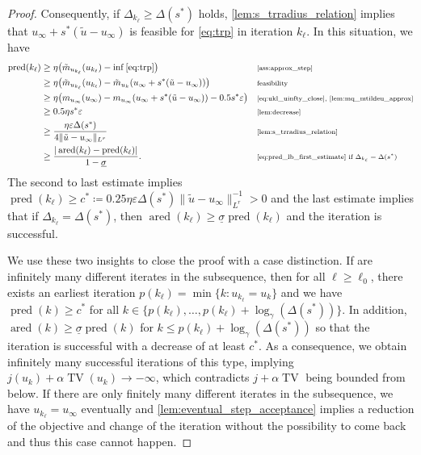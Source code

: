 \documentclass[11pt]{article}
\DeclareMathOperator*{\TV}{TV}
\DeclareMathOperator*{\pred}{pred}
\DeclareMathOperator*{\ared}{ared}
\theoremstyle{definition}
\theoremstyle{remark}
\begin{document}
\begin{proof}
Consequently, if $\Delta_{k_\ell} \ge \Delta(s^*)$
holds, \cref{lem:s_trradius_relation}
implies that $u_\infty + s^*(\tilde{u} - u_\infty)$
is feasible for \eqref{eq:trp} in iteration $k_\ell$.
In this situation, we have
%
\begin{align*}
\pred(k_\ell)
&\ge \eta\big(\tilde{m}_{u_{k_\ell}}(u_{k_\ell}) - \inf \eqref{eq:trp}\big) && \text{\scriptsize \cref{ass:approx_step}} \\
&\ge \eta\big(\tilde{m}_{u_{k_\ell}}(u_{k_\ell}) 
- \tilde{m}_{u_k}(u_\infty + s^*(\tilde{u} - u_\infty))\big)
&& \text{\scriptsize feasibility} \\
&\ge \eta\big(m_{u_\infty}(u_\infty) - m_{u_\infty}(u_\infty + s^*(\tilde{u} - u_\infty))
- 0.5 s^* \varepsilon\big) 
&& \text{\scriptsize \eqref{eq:ukl_uinfty_close},
\cref{lem:mq_mtildeu_approx}} \\
&\ge 0.5 \eta s^* \varepsilon
&& \text{\scriptsize \cref{lem:decrease}} \\
&\ge \frac{\eta \varepsilon \Delta(s^*)}{4\|\tilde{u} - u_\infty\|_{L^r}}
&& \text{\scriptsize \cref{lem:s_trradius_relation}} \\
&\ge \frac{|\ared(k_\ell) - \pred(k_\ell)|}{1 - \underline{\sigma}}.
&& \text{\scriptsize \eqref{eq:pred_lb_first_estimate}
if $\Delta_{k_\ell} = \Delta(s^*)$}
\end{align*}
%
The second to last estimate implies 
$\pred(k_\ell) \ge c^* \coloneqq 0.25 \eta \varepsilon \Delta(s^*) \|\tilde{u} - u_\infty\|_{L^r}^{-1} > 0$ and the last estimate
implies that if $\Delta_{k_\ell} = \Delta(s^*)$,
then
$\ared(k_\ell) \ge \underline{\sigma}\pred(k_\ell)$
and the iteration is successful.

We use these two insights to close the proof with a case distinction. If are infinitely many 
different iterates in the subsequence,
then for all $\ell \ge \ell_0$, there exists
an earliest iteration $p(k_{\ell}) = \min\{k : u_{k_\ell} = u_k\}$ and we have
$\pred(k) \ge c^*$ for all $k \in \{p(k_\ell),\ldots,p(k_\ell) + \log_{\gamma}(\Delta(s^*))\}$.
In addition, $\ared(k) \ge \underline{\sigma}\pred(k)$
for $k \le p(k_\ell) + \log_{\gamma}(\Delta(s^*))$
so that the iteration is successful with a decrease of
at least $c^*$. As a consequence, we obtain infinitely
many successful iterations of this type, implying
$j(u_k) + \alpha \TV(u_k) \to -\infty$, which contradicts $j + \alpha \TV$ being bounded from below.
If there are only finitely many different iterates
in the subsequence, we have $u_{k_\ell} = u_\infty$ 
eventually and
\cref{lem:eventual_step_acceptance} implies
a reduction of the objective and change of the iteration without the possibility to come back
and thus this case
cannot happen.
\end{proof}



\end{document}
